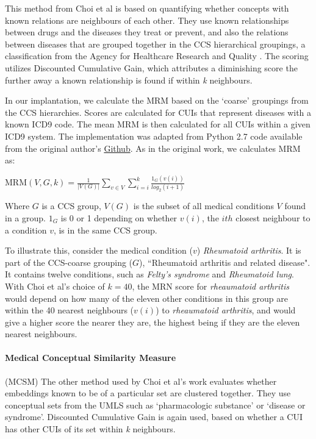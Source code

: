 \documentclass[11pt,a4paper]{article}
\begin{document}
This method from Choi et al  is based on quantifying whether concepts with known relations are neighbours of each other.  They use known relationships between drugs and the diseases they treat or prevent, and also the relations between diseases that are grouped together in the CCS hierarchical groupings, a classification from the Agency for Healthcare Research and Quality \cite{ClinicalClassificationsSoftware}. The scoring utilizes Discounted Cumulative Gain, which attributes a diminishing score the further away a known relationship is found if within \emph{k} neighbours. 

In our implantation, we calculate the MRM based on the `coarse' groupings from the CCS hierarchies. Scores are calculated for CUIs that represent diseases with a known ICD9 code. The mean MRM is then calculated for all CUIs within a given ICD9 system. The implementation was adapted from Python 2.7 code available from the original author's \href{https://github.com/clinicalml/embeddings}{Github}. As in the original work, we calculates MRM as:

MRM$(V,G,k) = \frac{1}{|V(G)|}\sum\limits_{v\in V}\sum\limits_{i=i}^k \frac{1_G(v(i))}{log_2(i+1)}$

Where $G$ is a CCS group, $V(G)$ is the subset of all medical conditions $V$ found in a group. $1_G$ is 0 or 1 depending on whether $v(i)$, the $ith$ closest neighbour to a condition $v$, is in the same CCS group.  

To illustrate this, consider the medical condition ($v$) \emph{Rheumatoid arthritis}. It is part of the CCS-coarse grouping ($G$), ``Rheumatoid arthritis and related disease". It contains twelve conditions, such as \emph{Felty's syndrome} and \emph{Rheumatoid lung}. With Choi et al's choice of $k=40$, the MRN score for \emph{rheaumatoid arthritis} would depend on how many of the eleven other conditions in this group are within the 40 nearest neighbours ($v(i)$) to \emph{rheaumatoid arthritis}, and would give a higher score the nearer they are, the highest being if they are the eleven nearest neighbours. 

\paragraph{Medical Conceptual Similarity Measure}(MCSM) The other method used by Choi et al's work evaluates whether embeddings known to be of a particular set are clustered together. They use conceptual sets from the UMLS such as `pharmacologic substance' or `disease or syndrome'.  Discounted Cumulative Gain is again used, based on whether a CUI has other CUIs of its set within \emph{k} neighbours. 
\end{document}

